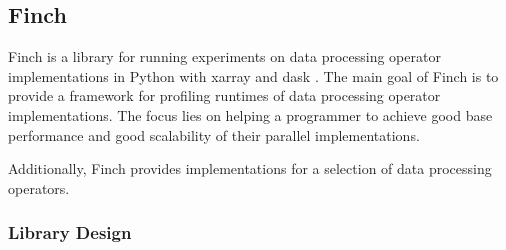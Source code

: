 \subsection{Finch}

Finch is a library for running experiments on data processing operator implementations in Python with xarray \cite{hoyer2017xarray} and dask \cite{rocklin2015dask}.
The main goal of Finch is to provide a framework for profiling runtimes of data processing operator implementations.
The focus lies on helping a programmer to achieve good base performance and good scalability of their parallel implementations.

Additionally, Finch provides implementations for a selection of data processing operators.

\subsubsection{Library Design}